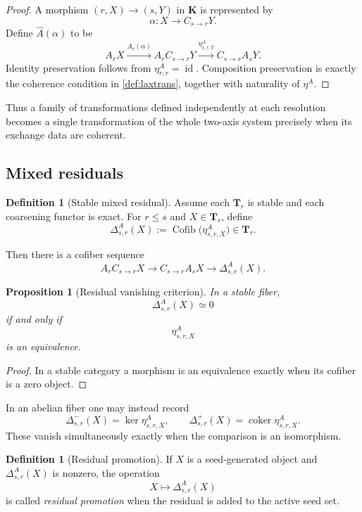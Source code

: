 \documentclass[11pt]{article}
\newtheorem{proposition}[theorem]{Proposition}
\theoremstyle{definition}
\newtheorem{definition}[theorem]{Definition}
\theoremstyle{remark}
\newcommand{\K}{\mathbf K}
\newcommand{\Tcat}{\mathbf T}
\newcommand{\Cofib}{\operatorname{Cofib}}
\newcommand{\id}{\operatorname{id}}
\begin{document}
\begin{proof}
A morphism $(r,X)\to(s,Y)$ in $\K$ is represented by
\[
\alpha:X\to C_{s\to r}Y.
\]
Define $\widehat A(\alpha)$ to be
\[
A_rX
\xrightarrow{A_r(\alpha)}
A_rC_{s\to r}Y
\xrightarrow{\eta^A_{s,r,Y}}
C_{s\to r}A_sY.
\]
Identity preservation follows from $\eta^A_{r,r}=\id$. Composition preservation is exactly the coherence condition in \cref{def:laxtrans}, together with naturality of $\eta^A$.
\end{proof}

Thus a family of transformations defined independently at each resolution becomes a single transformation of the whole two-axis system precisely when its exchange data are coherent.

\subsection{Mixed residuals}

\begin{definition}[Stable mixed residual]
Assume each $\Tcat_r$ is stable and each coarsening functor is exact. For $r\le s$ and $X\in\Tcat_s$, define
\[
\Delta^A_{s,r}(X)
:=
\Cofib\bigl(\eta^A_{s,r,X}\bigr)
\in\Tcat_r.
\]
\end{definition}

Then there is a cofiber sequence
\[
A_rC_{s\to r}X
\longrightarrow
C_{s\to r}A_sX
\longrightarrow
\Delta^A_{s,r}(X).
\]

\begin{proposition}[Residual vanishing criterion]\label{prop:residual-vanish}
In a stable fiber,
\[
\Delta^A_{s,r}(X)\simeq0
\]
if and only if
\[
\eta^A_{s,r,X}
\]
is an equivalence.
\end{proposition}

\begin{proof}
In a stable category a morphism is an equivalence exactly when its cofiber is a zero object.
\end{proof}

In an abelian fiber one may instead record
\[
\Delta^-_{s,r}(X)=\ker\eta^A_{s,r,X},
\qquad
\Delta^+_{s,r}(X)=\operatorname{coker}\eta^A_{s,r,X}.
\]
These vanish simultaneously exactly when the comparison is an isomorphism.

\begin{definition}[Residual promotion]
If $X$ is a seed-generated object and $\Delta^A_{s,r}(X)$ is nonzero, the operation
\[
X\longmapsto\Delta^A_{s,r}(X)
\]
is called \emph{residual promotion} when the residual is added to the active seed set.
\end{definition}
\end{document}
